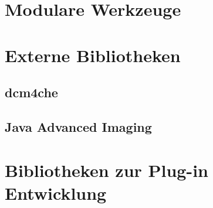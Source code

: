 \section{Modulare Werkzeuge}

\section{Externe Bibliotheken}

\subsection{dcm4che}

\subsection{Java Advanced Imaging}

\section{Bibliotheken zur Plug-in Entwicklung}